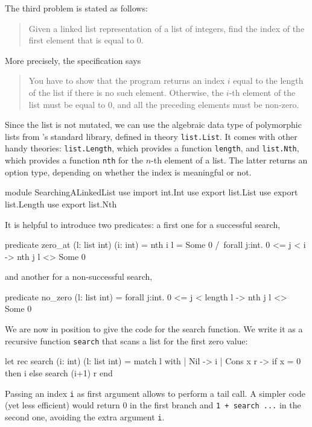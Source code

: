 The third problem is stated as follows:
\begin{quote}
  Given a linked list representation of a list of integers,
  find the index of the first element that is equal to 0.
\end{quote}
More precisely, the specification says
\begin{quote}
  You have to show that the program returns an index $i$ equal to the
  length of the list if there is no such element. Otherwise, the $i$-th
  element of the list must be equal to 0, and all the preceding
  elements must be non-zero.
\end{quote}
Since the list is not mutated, we can use the algebraic data type of
polymorphic lists from \why's standard library, defined in theory
\texttt{list.List}. It comes with other handy theories:
\texttt{list.Length}, which provides a function \texttt{length}, and
\texttt{list.Nth}, which provides a function \texttt{nth}
for the $n$-th element of a list. The latter returns an option type,
depending on whether the index is meaningful or not.
\begin{whycode}
module SearchingALinkedList
  use import int.Int
  use export list.List
  use export list.Length
  use export list.Nth
\end{whycode}
It is helpful to introduce two predicates: a first one
for a successful search,
\begin{whycode}
  predicate zero_at (l: list int) (i: int) =
    nth i l = Some 0 /\ forall j:int. 0 <= j < i -> nth j l <> Some 0
\end{whycode}
and another for a non-successful search,
\begin{whycode}
  predicate no_zero (l: list int) =
    forall j:int. 0 <= j < length l -> nth j l <> Some 0
\end{whycode}
We are now in position to give the code for the search function.
We write it as a recursive function \texttt{search} that scans a list
for the first zero value:
\begin{whycode}
  let rec search (i: int) (l: list int) =
    match l with
    | Nil      -> i
    | Cons x r -> if x = 0 then i else search (i+1) r
    end
\end{whycode}
Passing an index \texttt{i} as first argument allows to perform a tail
call. A simpler code (yet less efficient) would return 0 in the first
branch and \texttt{1 + search ...} in the second one, avoiding the
extra argument \texttt{i}.

